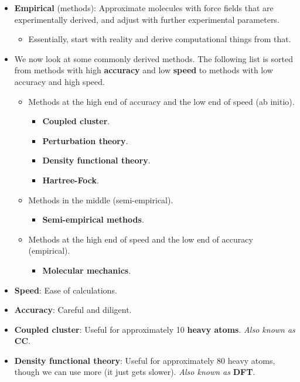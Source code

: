 \documentclass[../notes.tex]{subfiles}
\begin{document}
\begin{itemize}
\begin{itemize}
    \end{itemize}
    \item \textbf{Empirical} (methods): Approximate molecules with force fields that are experimentally derived, and adjust with further experimental parameters.
    \begin{itemize}
        \item Essentially, start with reality and derive computational things from that.
    \end{itemize}
    \item We now look at some commonly derived methods. The following list is sorted from methods with high \textbf{accuracy} and low \textbf{speed} to methods with low accuracy and high speed.
    \begin{itemize}
        \item Methods at the high end of accuracy and the low end of speed (ab initio).
        \begin{itemize}
            \item \textbf{Coupled cluster}.
            \item \textbf{Perturbation theory}.
            \item \textbf{Density functional theory}.
            \item \textbf{Hartree-Fock}.
        \end{itemize}
        \item Methods in the middle (semi-empirical).
        \begin{itemize}
            \item \textbf{Semi-empirical methods}.
        \end{itemize}
        \item Methods at the high end of speed and the low end of accuracy (empirical).
        \begin{itemize}
            \item \textbf{Molecular mechanics}.
        \end{itemize}
    \end{itemize}
    \item \textbf{Speed}: Ease of calculations.
    \item \textbf{Accuracy}: Careful and diligent.
    \item \textbf{Coupled cluster}: Useful for approximately 10 \textbf{heavy atoms}. \emph{Also known as} \textbf{CC}.
    \item \textbf{Density functional theory}: Useful for approximately 80 heavy atoms, though we can use more (it just gets slower). \emph{Also known as} \textbf{DFT}.

\end{itemize}
\end{document}
